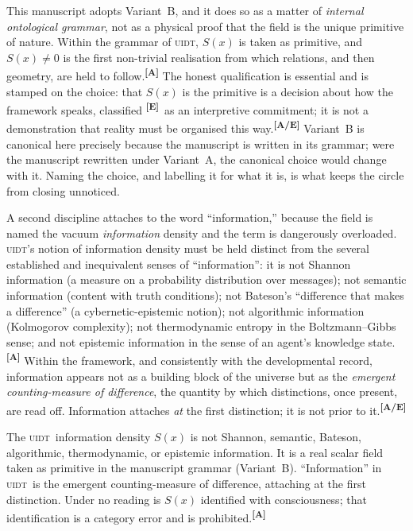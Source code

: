 \documentclass[12pt,a4paper,twoside]{article}
\theoremstyle{plain}
\theoremstyle{definition}
\theoremstyle{remark}
\newcommand{\UIDT}{\textsc{uidt}}
\newcommand{\catmark}[1]{\textsuperscript{\textsf{\textbf{[#1]}}}}
\begin{document}
This manuscript adopts Variant~B, and it does so as a matter of \emph{internal ontological grammar}, not as a physical proof that the field is the unique primitive of nature. Within the grammar of \UIDT, $S(x)$ is taken as primitive, and $S(x)\neq 0$ is the first non-trivial realisation from which relations, and then geometry, are held to follow.\catmark{A} The honest qualification is essential and is stamped on the choice: that $S(x)$ is the primitive is a decision about how the framework speaks, classified \catmark{E}\ as an interpretive commitment; it is not a demonstration that reality must be organised this way.\catmark{A/E} Variant~B is canonical here precisely because the manuscript is written in its grammar; were the manuscript rewritten under Variant~A, the canonical choice would change with it. Naming the choice, and labelling it for what it is, is what keeps the circle from closing unnoticed.

A second discipline attaches to the word ``information,'' because the field is named the vacuum \emph{information} density and the term is dangerously overloaded. \UIDT's notion of information density must be held distinct from the several established and inequivalent senses of ``information'': it is not Shannon information (a measure on a probability distribution over messages); not semantic information (content with truth conditions); not Bateson's ``difference that makes a difference'' (a cybernetic-epistemic notion); not algorithmic information (Kolmogorov complexity); not thermodynamic entropy in the Boltzmann--Gibbs sense; and not epistemic information in the sense of an agent's knowledge state.\catmark{A} Within the framework, and consistently with the developmental record, information appears not as a building block of the universe but as the \emph{emergent counting-measure of difference}, the quantity by which distinctions, once present, are read off. Information attaches \emph{at} the first distinction; it is not prior to it.\catmark{A/E}

\begin{governancebox}
The \UIDT\ information density $S(x)$ is not Shannon, semantic, Bateson, algorithmic, thermodynamic, or epistemic information. It is a real scalar field taken as primitive in the manuscript grammar (Variant~B). ``Information'' in \UIDT\ is the emergent counting-measure of difference, attaching at the first distinction. Under no reading is $S(x)$ identified with consciousness; that identification is a category error and is prohibited.\catmark{A}
\end{governancebox}
\end{document}
